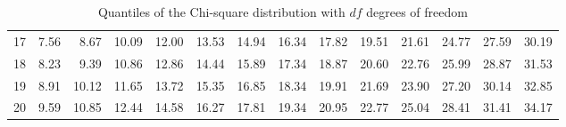 \begin{table}[!ht]
\begin{tabular}{@{}r@{~~}r@{~~}r@{~~}r@{~~}r@{~~}r@{~~}r@{~~}r@{~~}r@{~~}r@{~~}r@{~~}r@{~~}r@{~~}r@{}}
  17 & 7.56 & 8.67 & 10.09 & 12.00 & 13.53 & 14.94 & 16.34 & 17.82 & 19.51 & 21.61 & 24.77 & 27.59 & 30.19 \\ 
  18 & 8.23 & 9.39 & 10.86 & 12.86 & 14.44 & 15.89 & 17.34 & 18.87 & 20.60 & 22.76 & 25.99 & 28.87 & 31.53 \\ 
  19 & 8.91 & 10.12 & 11.65 & 13.72 & 15.35 & 16.85 & 18.34 & 19.91 & 21.69 & 23.90 & 27.20 & 30.14 & 32.85 \\ 
  20 & 9.59 & 10.85 & 12.44 & 14.58 & 16.27 & 17.81 & 19.34 & 20.95 & 22.77 & 25.04 & 28.41 & 31.41 & 34.17 \\ 
   \hline
\end{tabular}
\caption{Quantiles of the Chi-square distribution with $df$ degrees of freedom} 
\end{table}
